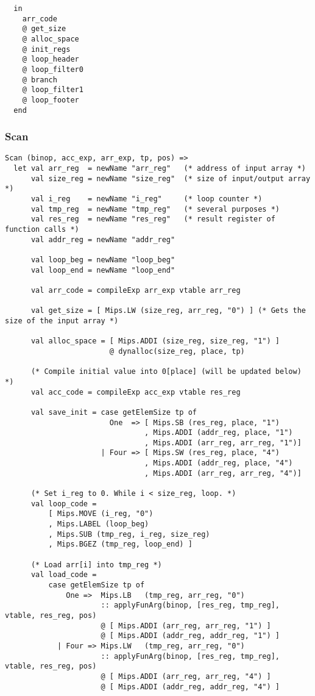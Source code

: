 \documentclass[12pt]{article}
\begin{document}
\begin{center}
\begin{center}
\begin{verbatim}
  in
    arr_code
    @ get_size
    @ alloc_space
    @ init_regs
    @ loop_header
    @ loop_filter0
    @ branch
    @ loop_filter1
    @ loop_footer
  end
\end{verbatim}

\subsubsection{Scan}
\begin{verbatim}
Scan (binop, acc_exp, arr_exp, tp, pos) =>
  let val arr_reg  = newName "arr_reg"   (* address of input array *)
      val size_reg = newName "size_reg"  (* size of input/output array *)
      val i_reg    = newName "i_reg"     (* loop counter *)
      val tmp_reg  = newName "tmp_reg"   (* several purposes *)
      val res_reg  = newName "res_reg"   (* result register of function calls *)
      val addr_reg = newName "addr_reg"

      val loop_beg = newName "loop_beg"
      val loop_end = newName "loop_end"

      val arr_code = compileExp arr_exp vtable arr_reg

      val get_size = [ Mips.LW (size_reg, arr_reg, "0") ] (* Gets the size of the input array *)

      val alloc_space = [ Mips.ADDI (size_reg, size_reg, "1") ]
                        @ dynalloc(size_reg, place, tp)

      (* Compile initial value into 0[place] (will be updated below) *)
      val acc_code = compileExp acc_exp vtable res_reg 

      val save_init = case getElemSize tp of
                        One  => [ Mips.SB (res_reg, place, "1")
                                , Mips.ADDI (addr_reg, place, "1")
                                , Mips.ADDI (arr_reg, arr_reg, "1")]
                      | Four => [ Mips.SW (res_reg, place, "4")
                                , Mips.ADDI (addr_reg, place, "4")
                                , Mips.ADDI (arr_reg, arr_reg, "4")]

      (* Set i_reg to 0. While i < size_reg, loop. *)
      val loop_code =
          [ Mips.MOVE (i_reg, "0")
          , Mips.LABEL (loop_beg)
          , Mips.SUB (tmp_reg, i_reg, size_reg)
          , Mips.BGEZ (tmp_reg, loop_end) ]

      (* Load arr[i] into tmp_reg *)
      val load_code =
          case getElemSize tp of
              One =>  Mips.LB   (tmp_reg, arr_reg, "0")
                      :: applyFunArg(binop, [res_reg, tmp_reg], vtable, res_reg, pos)
                      @ [ Mips.ADDI (arr_reg, arr_reg, "1") ]
                      @ [ Mips.ADDI (addr_reg, addr_reg, "1") ]
            | Four => Mips.LW   (tmp_reg, arr_reg, "0")
                      :: applyFunArg(binop, [res_reg, tmp_reg], vtable, res_reg, pos)
                      @ [ Mips.ADDI (arr_reg, arr_reg, "4") ]
                      @ [ Mips.ADDI (addr_reg, addr_reg, "4") ]


\end{verbatim}
\end{center}
\end{center}
\end{document}
